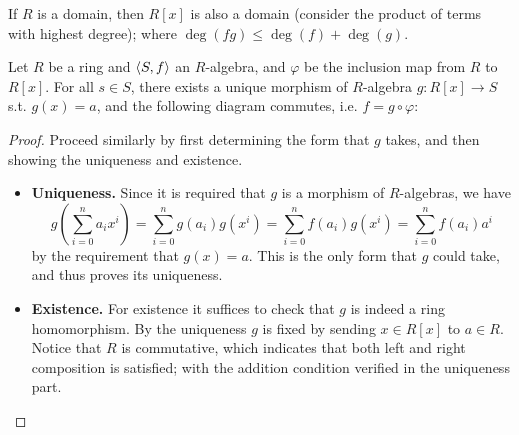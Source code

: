 \documentclass{article}
\begin{document}
\begin{remark}
    If $R$ is a domain, then $R[x]$ is also a domain (consider the product of terms with highest degree); where $\deg (f g) \leq \deg (f) + \deg (g)$.
\end{remark}

\begin{theorem}
    Let $R$ be a ring and $\langle S, f \rangle$ an $R$-algebra, and $\varphi$ be the inclusion map from $R$ to $R[x]$. For all $s\in S$, there exists a unique morphism of $R$-algebra $g: R[x] \to S$ s.t. $g(x) = a$, and the following diagram commutes, i.e. $f = g\circ \varphi$:
    \begin{figure}[htbp]
        \centering    
    \end{figure}
\end{theorem}

\begin{proof}
    Proceed similarly by first determining the form that $g$ takes, and then showing the uniqueness and existence. 
    \begin{itemize}
        \item \textbf{Uniqueness.} Since it is required that $g$ is a morphism of $R$-algebras, we have
        \[
            g\left( \sum\limits_{i=0}^n a_i x^i\right) = \sum\limits_{i=0}^{n} g(a_i) g(x^i) = \sum\limits_{i=0}^{n} f(a_i) g(x^i) = \sum\limits_{i=0}^{n} f(a_i) a^i
        \]
        by the requirement that $g(x) = a$. This is the only form that $g$ could take, and thus proves its uniqueness.
        \item \textbf{Existence.} For existence it suffices to check that $g$ is indeed a ring homomorphism. By the uniqueness $g$ is fixed by sending $x\in R[x]$ to $a\in R$. Notice that $R$ is commutative, which indicates that both left and right composition is satisfied; with the addition condition verified in the uniqueness part. 
    \end{itemize}
\end{proof}
\end{document}
